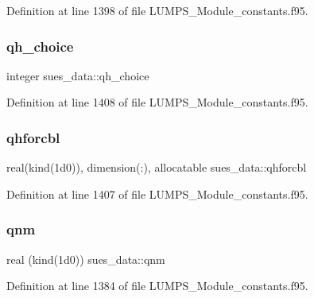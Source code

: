 Definition at line 1398 of file L\+U\+M\+P\+S\+\_\+\+Module\+\_\+constants.\+f95.

\mbox{\label{namespacesues__data_a2333d97226ad99ef4b17125ad7c3b205}} 
\subsubsection{\texorpdfstring{qh\+\_\+choice}{qh\_choice}}
{\footnotesize\ttfamily integer sues\+\_\+data\+::qh\+\_\+choice}



Definition at line 1408 of file L\+U\+M\+P\+S\+\_\+\+Module\+\_\+constants.\+f95.

\mbox{\label{namespacesues__data_a891cda3d0ef1f628e7dd9a185f00fc6c}} 
\subsubsection{\texorpdfstring{qhforcbl}{qhforcbl}}
{\footnotesize\ttfamily real(kind(1d0)), dimension(\+:), allocatable sues\+\_\+data\+::qhforcbl}



Definition at line 1407 of file L\+U\+M\+P\+S\+\_\+\+Module\+\_\+constants.\+f95.

\mbox{\label{namespacesues__data_aa14586435e8c54f775a51aa1dd21ef28}} 
\subsubsection{\texorpdfstring{qnm}{qnm}}
{\footnotesize\ttfamily real (kind(1d0)) sues\+\_\+data\+::qnm}



Definition at line 1384 of file L\+U\+M\+P\+S\+\_\+\+Module\+\_\+constants.\+f95.

\mbox{\label{namespacesues__data_aafce3a183c34dd4df5268cdbfc8aea24}} 
